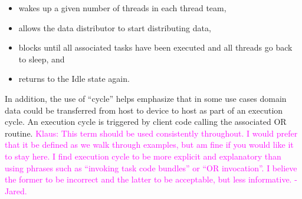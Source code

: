 \documentclass{article}
\newcommand{\KlausRfromJO}[1]   {\textcolor{magenta}{Klaus: #1 - Jared.}}
\newcommand{\shortOR}   {OR\xspace}
\newcommand{\OR}        {\shortOR}
\begin{document}
\begin{itemize}
\begin{itemize}
\item{wakes up a given number of threads in each thread team,}
\item{allows the data distributor to start distributing data,}
\item{blocks until all associated tasks have been executed and all threads go
back to sleep, and}
\item{returns to the Idle state again.}
\end{itemize}
In addition, the use of ``cycle'' helps emphasize that in some use cases domain
data could be transferred from host to device to host as part of an execution
cycle.  An execution cycle is
triggered by client code calling the associated \OR routine.
\KlausRfromJO{This term should be used
consistently throughout.  I would prefer that it be defined as we walk through
examples, but am fine if you would like it to stay here.  I find execution cycle to be more explicit and
explanatory than using phrases such as ``invoking task code bundles'' or ``OR
invocation''.  I believe the former to be incorrect and the latter to be
acceptable, but less informative.}
\end{itemize}
\end{document}
